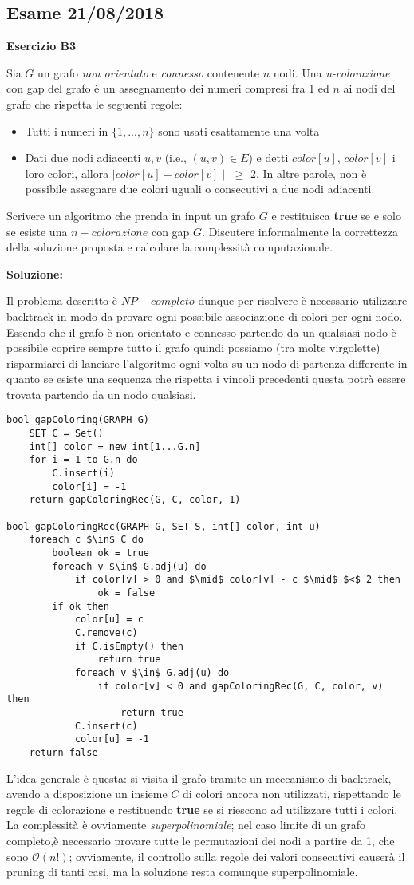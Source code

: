 \documentclass[../cheatSheetAlgoritmi.tex]{subfiles}
\begin{document}
\subsection{Esame 21/08/2018}
\textbf{Esercizio B3}

Sia $G$ un grafo \emph{non orientato} e \emph{connesso} contenente $n$ nodi. Una \emph{n-colorazione} con gap del grafo è un assegnamento dei numeri compresi fra 1 ed $n$ ai nodi del grafo che rispetta le seguenti regole:
\begin{itemize}
	\item Tutti i numeri in $\{1,...,n\}$ sono usati esattamente una volta
	\item Dati due nodi adiacenti $u, v$ (i.e., $(u, v) \in E$) e detti $color[u]$, $color[v]$ i  loro  colori,  allora $\mid color[u] - color[v] \mid$ $\geq$ 2. In altre parole, non è possibile assegnare due colori uguali o consecutivi a due nodi adiacenti.
\end{itemize}
Scrivere un algoritmo che prenda in input un grafo $G$ e restituisca \textbf{true} se e solo se esiste una $n-colorazione$ con gap $G$. Discutere informalmente la correttezza   della soluzione proposta e calcolare la complessità computazionale.

\textbf{Soluzione:}

Il problema descritto è $NP-completo$ dunque per risolvere è necessario utilizzare backtrack in modo da provare ogni possibile associazione di colori per ogni nodo. Essendo che il grafo è non orientato e connesso partendo da un qualsiasi nodo è possibile coprire sempre tutto il grafo quindi possiamo (tra molte virgolette) risparmiarci di lanciare l'algoritmo ogni volta su un nodo di partenza differente in quanto se esiste una sequenza che rispetta i vincoli precedenti questa potrà essere trovata partendo da un nodo qualsiasi.
\begin{lstlisting}[caption=n-Colorazione (gapColoring)]
bool gapColoring(GRAPH G)
	SET C = Set()
	int[] color = new int[1...G.n]
	for i = 1 to G.n do
		C.insert(i)
		color[i] = -1
	return gapColoringRec(G, C, color, 1)
	
bool gapColoringRec(GRAPH G, SET S, int[] color, int u)
	foreach c $\in$ C do
		boolean ok = true
		foreach v $\in$ G.adj(u) do
			if color[v] > 0 and $\mid$ color[v] - c $\mid$ $<$ 2 then
				ok = false
		if ok then
			color[u] = c
			C.remove(c)
			if C.isEmpty() then
				return true
			foreach v $\in$ G.adj(u) do
				if color[v] < 0 and gapColoringRec(G, C, color, v) then
					return true
			C.insert(c)
			color[u] = -1
	return false
\end{lstlisting}
L'idea generale è questa: si visita il grafo tramite un meccanismo di backtrack, avendo a disposizione un insieme $C$ di colori ancora non utilizzati, rispettando le regole di colorazione e restituendo \textbf{true} se si riescono ad utilizzare tutti i colori. La complessità è ovviamente \emph{superpolinomiale}; nel caso limite di un grafo completo,è necessario provare tutte le permutazioni dei nodi a partire da 1, che sono $\mathcal{O}(n!)$; ovviamente, il controllo sulla regole dei valori consecutivi causerà il pruning di tanti casi, ma la soluzione resta comunque superpolinomiale.
\newpage
\end{document}

